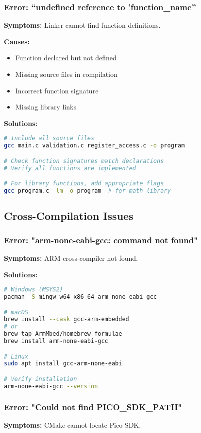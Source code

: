 \documentclass[11pt,a4paper]{article}
\begin{document}
\subsubsection{Error: ``undefined reference to 'function\_name''}
\textbf{Symptoms:} Linker cannot find function definitions.

\textbf{Causes:}
\begin{itemize}
    \item Function declared but not defined
    \item Missing source files in compilation
    \item Incorrect function signature
    \item Missing library links
\end{itemize}

\textbf{Solutions:}
\begin{lstlisting}[language=bash]
# Include all source files
gcc main.c validation.c register_access.c -o program

# Check function signatures match declarations
# Verify all functions are implemented

# For library functions, add appropriate flags
gcc program.c -lm -o program  # for math library
\end{lstlisting}

\subsection{Cross-Compilation Issues}

\subsubsection{Error: "arm-none-eabi-gcc: command not found"}
\textbf{Symptoms:} ARM cross-compiler not found.

\textbf{Solutions:}
\begin{lstlisting}[language=bash]
# Windows (MSYS2)
pacman -S mingw-w64-x86_64-arm-none-eabi-gcc

# macOS
brew install --cask gcc-arm-embedded
# or
brew tap ArmMbed/homebrew-formulae
brew install arm-none-eabi-gcc

# Linux
sudo apt install gcc-arm-none-eabi

# Verify installation
arm-none-eabi-gcc --version
\end{lstlisting}

\subsubsection{Error: "Could not find PICO\_SDK\_PATH"}
\textbf{Symptoms:} CMake cannot locate Pico SDK.
\end{document}
